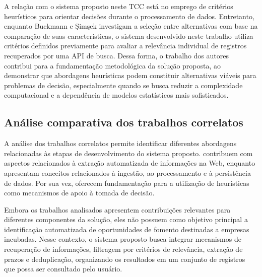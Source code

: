 A relação com o sistema proposto neste TCC está no emprego de critérios heurísticos para orientar decisões durante o processamento de dados. Entretanto, enquanto Buckmann e Şimşek investigam a seleção entre alternativas com base na comparação de suas características, o sistema desenvolvido neste trabalho utiliza critérios definidos previamente para avaliar a relevância individual de registros recuperados por uma API de busca. Dessa forma, o trabalho dos autores contribui para a fundamentação metodológica da solução proposta, ao demonstrar que abordagens heurísticas podem constituir alternativas viáveis para problemas de decisão, especialmente quando se busca reduzir a complexidade computacional e a dependência de modelos estatísticos mais sofisticados.

\subsection{Análise comparativa dos trabalhos correlatos}

A análise dos trabalhos correlatos permite identificar diferentes abordagens relacionadas às etapas de desenvolvimento do sistema proposto.  contribuem com aspectos relacionados à extração automatizada de informações na Web, enquanto  apresentam conceitos relacionados à ingestão, ao processamento e à persistência de dados. Por sua vez,  oferecem fundamentação para a utilização de heurísticas como mecanismos de apoio à tomada de decisão.

Embora os trabalhos analisados apresentem contribuições relevantes para diferentes componentes da solução, eles não possuem como objetivo principal a identificação automatizada de oportunidades de fomento destinadas a empresas incubadas. Nesse contexto, o sistema proposto busca integrar mecanismos de recuperação de informações, filtragem por critérios de relevância, extração de prazos e deduplicação, organizando os resultados em um conjunto de registros que possa ser consultado pelo usuário.

